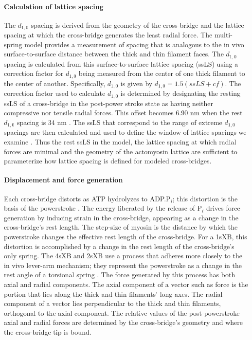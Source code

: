 \documentclass[]{article}
\begin{document}
\paragraph{Calculation of lattice spacing} %
The $d_{1,0}$ spacing is derived from the geometry of the cross-bridge and the lattice spacing at which the cross-bridge generates the least radial force. 
The multi-spring model provides a measurement of spacing that is analogous to the in vivo surface-to-surface distance between the thick and thin filament faces.
The $d_{1,0}$ spacing is calculated from this surface-to-surface lattice spacing (ssLS) using a correction factor for $d_{1,0}$ being measured from the center of one thick filament to the center of another. 
Specifically, $d_{1,0}$ is given by $d_{1,0} = 1.5 (ssLS + cf)$. %
The correction factor used to calculate $d_{1,0}$ is determined by designating the resting ssLS of a cross-bridge in the post-power stroke state as having neither compressive nor tensile radial forces. 
This offset becomes 6.90 nm when the rest $d_{1,0}$ spacing is 34 nm \citep{Brenner1991}. 
The ssLS that correspond to the range of extreme $d_{1,0}$ spacings are then calculated and used to define the window of lattice spacings we examine \citep{Millman1998}. %
Thus the rest ssLS in the model, the lattice spacing at which radial forces are minimal and the geometry of the actomyosin lattice are sufficient to parameterize how lattice spacing is defined for modeled cross-bridges. 

\paragraph{Displacement and force generation} %
Each cross-bridge distorts as ATP hydrolyzes to ADP.P$_i$; this distortion is the basis of the powerstroke \citep{Pate1989, Daniel1998, Tanner2007}. 
The energy liberated by the release of P$_i$ drives force generation by inducing strain in the cross-bridge, appearing as a change in the cross-bridge's rest length.  
The step-size of myosin is the distance by which the powerstroke changes the effective rest length of the cross-bridge.  
For a 1sXB, this distortion is accomplished by a change in the rest length of the cross-bridge's only spring. 
The 4sXB and 2sXB use a process that adheres more closely to the in vivo lever-arm mechanism; they represent the powerstroke as a change in the rest angle of a torsional spring \citep{Reedy2000}.
The force generated by this process has both axial and radial components. 
The axial component of a vector such as force is the portion that lies along the thick and thin filaments' long axes. 
The radial component of a vector lies perpendicular to the thick and thin filaments, orthogonal to the axial component. 
The relative values of the post-powerstroke axial and radial forces are determined by the cross-bridge's geometry and where the cross-bridge tip is bound. 
\end{document}
